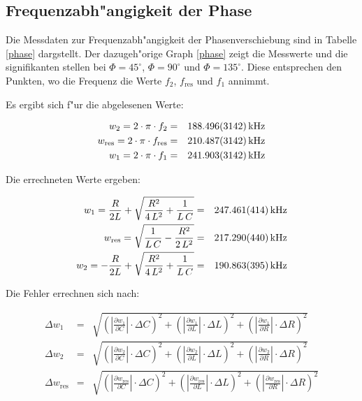 	\subsection{Frequenzabh"angigkeit der Phase} %
	\label{sub:frequenzabh"angigkeit_der_phase}
	
	Die Messdaten zur Frequenzabh"angigkeit der Phasenverschiebung sind in Tabelle \eqref{phase} dargstellt.
	Der dazugeh"orige Graph \eqref{phase} zeigt die Messwerte und die signifikanten stellen bei $\Phi = 45^\circ$, $\Phi = 90^\circ$ und $\Phi = 135^\circ$.
	Diese entsprechen den Punkten, wo die Frequenz die Werte $f_2$, $f_\mathrm{res}$ und $f_1$ annimmt.

	Es ergibt sich f"ur die abgelesenen Werte:

	\begin{eqnarray*}
		w_2 = 2 \cdot \pi \cdot f_2 &=& \SI{188.496 (3142)}{\kilo \hertz}\\
		w_\mathrm{res} = 2 \cdot \pi \cdot f_\mathrm{res} &=& \SI{210.487 (3142)}{\kilo \hertz}\\
		w_1 = 2 \cdot \pi \cdot f_1 &=& \SI{241.903 (3142)}{\kilo \hertz}
	\end{eqnarray*}

	Die errechneten Werte ergeben:

	\begin{eqnarray*}
		w_1 = \frac{R}{2L} + \sqrt{\frac{R^2}{4\,L^2} + \frac{1}{L \, C}} &=& \SI{247.461 (414)}{\kilo \hertz}\\
		w_\mathrm{res} = \sqrt{\frac{1}{L\, C} - \frac{R^2}{2 \, L^2}} &=& \SI{217.290 (440)}{\kilo \hertz}\\
		w_2 = -\frac{R}{2L} + \sqrt{\frac{R^2}{4\,L^2} + \frac{1}{L \, C}} &=& \SI{190.863 (395)}{\kilo \hertz}
	\end{eqnarray*}

	Die Fehler errechnen sich nach:

	\begin{eqnarray*}
		\Delta w_1 &=& \sqrt{ \left( |\frac{\partial w_1}{\partial C}| \cdot \Delta C\right)^2 + \left( |\frac{\partial w_1}{\partial L}| \cdot \Delta L \right)^2 + \left( |\frac{\partial w_1}{\partial R}| \cdot \Delta R \right)^2}\\
		\Delta w_2 &=& \sqrt{ \left( |\frac{\partial w_2}{\partial C}| \cdot \Delta C\right)^2 + \left( |\frac{\partial w_2}{\partial L}| \cdot \Delta L \right)^2 + \left( |\frac{\partial w_2}{\partial R}| \cdot \Delta R \right)^2}\\
		\Delta w_\mathrm{res} &=& \sqrt{ \left( |\frac{\partial w_\mathrm{res}}{\partial C}| \cdot \Delta C\right)^2 + \left( |\frac{\partial w_\mathrm{res}}{\partial L}| \cdot \Delta L \right)^2 + \left( |\frac{\partial w_\mathrm{res}}{\partial R}| \cdot \Delta R \right)^2}
	\end{eqnarray*}

